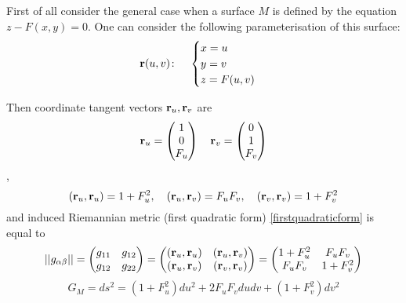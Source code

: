\documentclass[12pt]{article}
\theoremstyle{theorem}
\numberwithin{equation}{section}
\begin{document}
\m

First of all  consider  the general case when
 a surface $M$ is defined by the
 equation $z-F(x,y)=0$. One can consider the following parameterisation
 of this surface:
\begin{equation}\label{surface}
  {\bf r}(u,v)\colon\quad
  \begin{cases}
  x=u\\
  y=v\\
  z=F(u,v)
  \end{cases}
\end{equation}

Then  coordinate tangent vectors ${\bf r}_u,{\bf r}_v$ are
  \begin{equation}\label{c}
  {\bf r}_u=\begin{pmatrix}
        1\\
        0\\
        F_u\\
   \end{pmatrix}
\quad
  {\bf r}_v=\begin{pmatrix}
        0\\
        1\\
        F_v\\
   \end{pmatrix}
 \end{equation},
            $$
     ({\bf r}_u,{\bf r}_u)=1+F_u^2,\quad
     ({\bf r}_u,{\bf r}_v)=F_uF_v,\quad
     ({\bf r}_v,{\bf r}_v)=1+F_v^2
            $$
and induced Riemannian metric (first quadratic form) \eqref{firstquadraticform} is equal to
\begin{equation}\label{formula forfirstform}
   ||g_{\alpha\beta}||=
\begin{pmatrix}
   g_{11} & g_{12} \\
   g_{12}& g_{22} \\
   \end{pmatrix}=
   \begin{pmatrix}
   ({\bf r}_u,{\bf r}_u) & ({\bf r}_u,{\bf r}_v) \\
   ({\bf r}_u,{\bf r}_v) & ({\bf r}_v,{\bf r}_v) \\
   \end{pmatrix}=   \begin{pmatrix}
   1+F_u^2 & F_uF_v \\
   F_uF_v& 1+F_v^2 \\
   \end{pmatrix}
\end{equation}
\begin{equation}\label{formula forfirstformgeneral1}
   G_M=ds^2=(1+F_u^2)du^2+2F_uF_vdudv+(1+F_v^2)dv^2
\end{equation}
\end{document}
